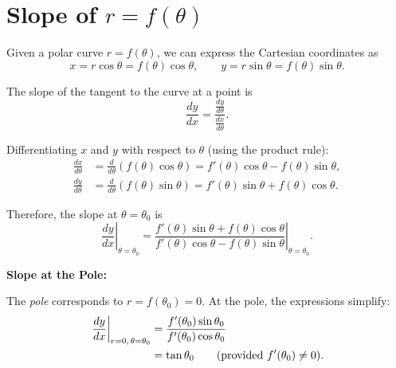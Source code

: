 \begin{table}[htpb]
  \centering
  \caption{Summary of Symmetricity of \(r=f(\theta)\)}
  \label{tab:summary-of-symmetricity-of-r-f-theta-}
\end{table}

\section{Slope of \(r=f(\theta)\)}
\label{sec:slope-of-r-f-theta}
Given a polar curve \( r = f(\theta) \), we can express the Cartesian coordinates as
\[
  x = r\cos\theta = f(\theta)\cos\theta, \qquad y = r\sin\theta = f(\theta)\sin\theta.
\]

The slope of the tangent to the curve at a point is
\[
  \frac{dy}{dx} = \frac{\frac{dy}{d\theta}}{\frac{dx}{d\theta}}.
\]

Differentiating \( x \) and \( y \) with respect to \( \theta \) (using the product rule):
\begin{align*}
  \frac{dx}{d\theta} &= \frac{d}{d\theta}\left( f(\theta)\cos\theta \right) = f'(\theta)\cos\theta - f(\theta)\sin\theta, \\
  \frac{dy}{d\theta} &= \frac{d}{d\theta}\left( f(\theta)\sin\theta \right) = f'(\theta)\sin\theta + f(\theta)\cos\theta.
\end{align*}

Therefore, the slope at \( \theta = \theta_0 \) is
\[
  \left. \frac{dy}{dx} \right|_{\theta = \theta_0}
    = 
    \left.
      \frac{f'(\theta)\sin\theta + f(\theta)\cos\theta}
      {f'(\theta)\cos\theta - f(\theta)\sin\theta}
      \right|_{\theta = \theta_0}.
    \]

    \bigskip

    \textbf{Slope at the Pole:}

    The \emph{pole} corresponds to \( r = f(\theta_0) = 0
    \). At the pole, the expressions simplify:
    \begin{align*}
      \left. \frac{dy}{dx} \right|_{r=0,\,\theta = \theta_0}
&= \frac{f'(\theta_0)\sin\theta_0}{f'(\theta_0)\cos\theta_0} \\
&= \tan\theta_0 \qquad \text{(provided \( f'(\theta_0) \neq 0 \)).}
    \end{align*}

